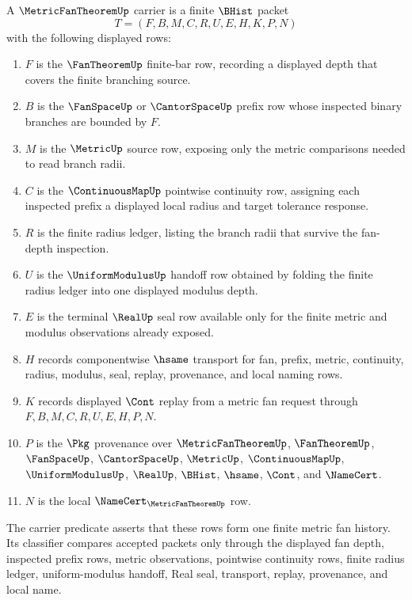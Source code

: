 \begin{definition}
\label{def:metric-fan-theorem-carrier}
A $\MetricFanTheoremUp$ carrier is a finite $\BHist$ packet
$$
T=(F,B,M,C,R,U,E,H,K,P,N)
$$
with the following displayed rows:
\begin{enumerate}
\item $F$ is the $\FanTheoremUp$ finite-bar row, recording a displayed depth that covers the finite branching source.
\item $B$ is the $\FanSpaceUp$ or $\CantorSpaceUp$ prefix row whose inspected binary branches are bounded by $F$.
\item $M$ is the $\MetricUp$ source row, exposing only the metric comparisons needed to read branch radii.
\item $C$ is the $\ContinuousMapUp$ pointwise continuity row, assigning each inspected prefix a displayed local radius and target tolerance response.
\item $R$ is the finite radius ledger, listing the branch radii that survive the fan-depth inspection.
\item $U$ is the $\UniformModulusUp$ handoff row obtained by folding the finite radius ledger into one displayed modulus depth.
\item $E$ is the terminal $\RealUp$ seal row available only for the finite metric and modulus observations already exposed.
\item $H$ records componentwise $\hsame$ transport for fan, prefix, metric, continuity, radius, modulus, seal, replay, provenance, and local naming rows.
\item $K$ records displayed $\Cont$ replay from a metric fan request through $F,B,M,C,R,U,E,H,P,N$.
\item $P$ is the $\Pkg$ provenance over $\MetricFanTheoremUp$, $\FanTheoremUp$, $\FanSpaceUp$, $\CantorSpaceUp$, $\MetricUp$, $\ContinuousMapUp$, $\UniformModulusUp$, $\RealUp$, $\BHist$, $\hsame$, $\Cont$, and $\NameCert$.
\item $N$ is the local $\NameCert_{\MetricFanTheoremUp}$ row.
\end{enumerate}
The carrier predicate asserts that these rows form one finite metric fan history. Its classifier compares accepted packets only through the displayed fan depth, inspected prefix rows, metric observations, pointwise continuity rows, finite radius ledger, uniform-modulus handoff, Real seal, transport, replay, provenance, and local name.
\end{definition}

